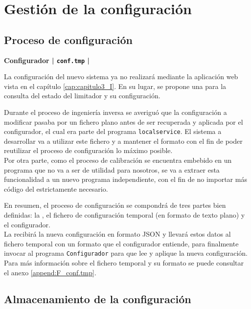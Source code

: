 \section{Gestión de la configuración}

\subsection{Proceso de configuración}

\begin{flushright}
\textbf{Configurador | \texttt{conf.tmp} | }
\end{flushright}

La configuración del nuevo sistema ya no realizará mediante la aplicación web vista en el capítulo \ref{cap:capitulo3_I}. En su lugar, se propone una  para la consulta del estado del limitador y su configuración.

Durante el proceso de ingeniería inversa se averiguó que la configuración a modificar pasaba por un fichero plano antes de ser recuperada y aplicada por el configurador, el cual era parte del programa \texttt{localservice}. El sistema a desarrollar va a utilizar este fichero y a mantener el formato con el fin de poder reutilizar el proceso de configuración lo máximo posible.\\
Por otra parte, como el proceso de calibración se encuentra embebido en un programa que no va a ser de utilidad para nosotros, se va a extraer esta funcionalidad a un nuevo programa independiente, con el fin de no importar más código del estrictamente necesario.

En resumen, el proceso de configuración se compondrá de tres partes bien definidas: la , el fichero de configuración temporal (en formato de texto plano) y el configurador.\\
La  recibirá la nueva configuración en formato \acrshort{JSON} y llevará estos datos al fichero temporal con un formato que el configurador entiende, para finalmente invocar al programa \texttt{Configurador} para que lee y aplique la nueva configuración. Para más información sobre el fichero temporal y su formato se puede consultar el anexo \ref{append:F_conf.tmp}.

\subsection{Almacenamiento de la configuración}

